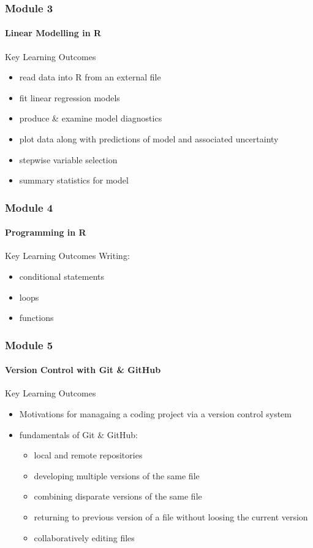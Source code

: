 \documentclass[xcolor=dvipsnames]{beamer}
\begin{document}
\begin{frame}
\frametitle{Module 3}
\framesubtitle{Linear Modelling in R}
\begin{block}{Key Learning Outcomes}
\begin{itemize}
\item read data into R from an external file
\item fit linear regression models
\item produce \& examine model diagnostics
\item plot data along with predictions of model and associated uncertainty
\item stepwise variable selection
\item summary statistics for model
\end{itemize}
\end{block}
\end{frame}

\begin{frame}
\frametitle{Module 4}
\framesubtitle{Programming in R}
\begin{block}{Key Learning Outcomes}
Writing:
\begin{itemize}
\item conditional statements
\item loops
\item functions
\end{itemize}
\end{block}
\end{frame}

\begin{frame}
\frametitle{Module 5}
\framesubtitle{Version Control with Git \& GitHub}
\begin{block}{Key Learning Outcomes}
\begin{itemize}
\item Motivations for managaing a coding project via a version control system
\item fundamentals of Git \& GitHub: \begin{itemize}
  \item local and remote repositories
  \item developing multiple versions of the same file
  \item combining disparate versions of the same file
  \item returning to previous version of a file without loosing the current version
  \item collaboratively editing files
  \end{itemize}
\end{itemize}
\end{block}
\end{frame}
\end{document}
